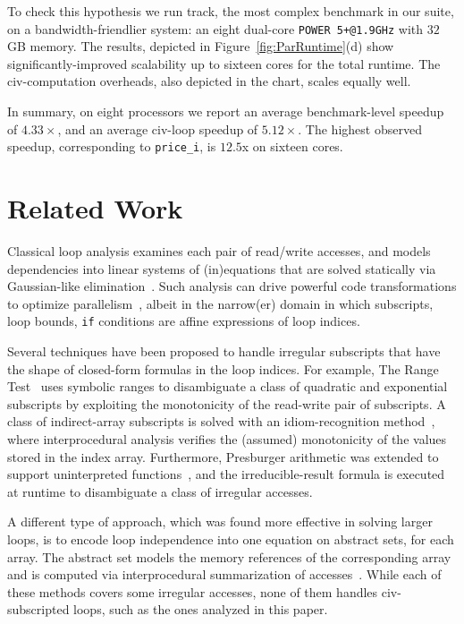 \documentclass[10pt,nocopyrightspace]{sigplanconf}
\begin{document}
To check this hypothesis we run {\sc track}, the most complex benchmark in our suite, 
on a bandwidth-friendlier system: an eight dual-core {\tt POWER 5+@1.9GHz} with $32$GB memory. 
The results, depicted in Figure~\ref{fig:ParRuntime}(d) show 
significantly-improved scalability up to sixteen cores for the 
total runtime. 
The {\sc civ}-computation overheads, also depicted in the chart, scales equally well.  
 
In summary, on eight processors we report an average benchmark-level
speedup of $4.33\times$, and an average {\sc civ}-loop speedup of $5.12\times$. 
The highest observed speedup, corresponding to {\tt price\_i}, is $12.5$x 
on sixteen cores.


\section{Related Work} 
\label{sec:RelWork}

Classical loop analysis examines each pair of read/write accesses, %
and models dependencies into linear systems of (in)equations that are solved
statically  via Gaussian-like elimination~\cite{BanerjeeIneqTest,FeautrierDataflow}. %
Such analysis  can drive powerful code transformations to optimize 
parallelism~\cite{PolyhedralOpt}, albeit in the narrow(er) domain 
in which subscripts, loop bounds, {\tt if} conditions are affine 
expressions of loop indices.

Several techniques have been proposed to handle irregular subscripts that have
the shape of closed-form formulas in the loop indices. For example, 
The Range Test~\cite{Blume94RangeTest} uses symbolic 
ranges to disambiguate a class of quadratic and  
exponential subscripts by exploiting the monotonicity of the read-write pair 
of subscripts.   A class of indirect-array subscripts is solved with 
an idiom-recognition method~\cite{PaduaDemDrInterproc}, where interprocedural 
analysis verifies the (assumed) monotonicity of the values stored in the 
index array.
%
Furthermore, Presburger arithmetic was extended to support
uninterpreted functions~\cite{Pugh98NonlinPresb}, and the irreducible-result
formula is executed at runtime to disambiguate a class of irregular
accesses. 

A different type of approach, which was found more effective in
solving larger loops, is to encode loop independence into one equation 
on abstract sets, for each array. The abstract set models the
memory references of the corresponding array and is computed 
via interprocedural summarization of 
accesses~\cite{SUIF,Moon99PredArrDataFlow,SummaryMonot,LMAD}.
While each of these methods covers some irregular accesses,
none of them handles {\sc civ}-subscripted loops,   
such as the ones analyzed in this paper.
%
\end{document}
